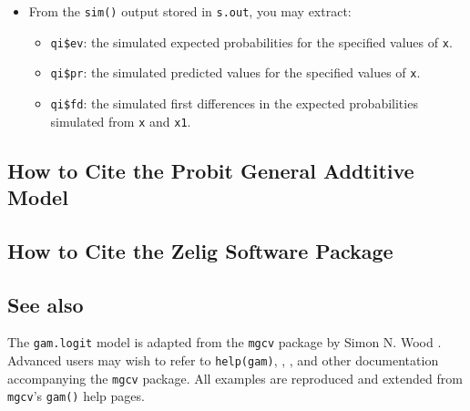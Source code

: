 \begin{itemize}
\item From the {\tt sim()} output stored in {\tt s.out}, you may extract:
\begin{itemize}
\item {\tt qi\$ev}: the simulated expected probabilities for the specified values of {\tt x}.
\item {\tt qi\$pr}: the simulated predicted values for the specified values of {\tt x}.
\item {\tt qi\$fd}: the simulated first differences in the expected probabilities simulated from {\tt x} and {\tt x1}.
\end{itemize}
\end{itemize}

\subsection*{How to Cite the Probit General Addtitive Model}

\subsection*{How to Cite the Zelig Software Package}
\CiteZelig

\subsection* {See also}
The {\tt gam.logit} model is adapted from the  {\tt mgcv} package by Simon N. Wood \citep{Wood06}. Advanced users may wish to refer to {\tt help(gam)},  \cite{Wood04}, \cite{Wood00}, and other documentation accompanying the {\tt mgcv} package. All examples are reproduced and extended from {\tt mgcv}'s {\tt gam()} help pages.




